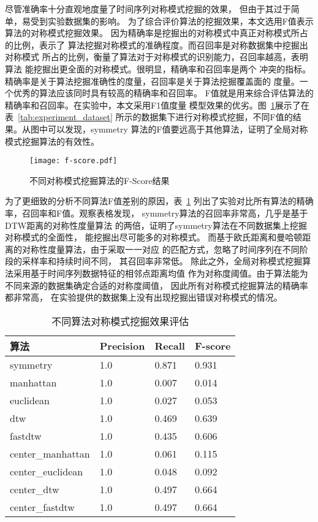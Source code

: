 尽管准确率十分直观地度量了时间序列对称模式挖掘的效果，
但由于其过于简单，易受到实验数据集的影响。
为了综合评价算法的挖掘效果，本文选用F值表示算法的对称模式挖掘效果。
因为精确率是挖掘出的对称模式中真正对称模式所占的比例，表示了
算法挖掘对称模式的准确程度。而召回率是对称数据集中挖掘出对称模式
所占的比例，衡量了算法对于对称模式的识别能力，召回率越高，表明算法
能挖掘出更全面的对称模式。很明显，精确率和召回率是两个
冲突的指标。精确率是关于算法挖掘准确性的度量，召回率是关于算法挖掘覆盖面的
度量。一个优秀的算法应该同时具有较高的精确率和召回率。
F值就是用来综合评估算法的精确率和召回率。在实验中，本文采用F1值度量
模型效果的优劣。图~\ref{fig:fscore_compare}展示了在表~\ref{tab:experiment_dataset}
所示的数据集下进行对称模式挖掘，不同F值的结果。从图中可以发现，symmetry
算法的F值要远高于其他算法，证明了全局对称模式挖掘算法的有效性。
\begin{figure}
  \centering
  \texttt{[image: f-score.pdf]}
  \caption{不同对称模式挖掘算法的F-Score结果}
  \label{fig:fscore_compare}
\end{figure}

为了更细致的分析不同算法F值差别的原因，表~\ref{tab:experiment_global_algo}
列出了实验对比所有算法的精确率，召回率和F值。观察表格发现，
symmetry算法的召回率非常高，几乎是基于DTW距离的对称性度量算法
的两倍，证明了symmetry算法在不同数据集上挖掘对称模式的全面性，
能挖掘出尽可能多的对称模式。
而基于欧氏距离和曼哈顿距离的对称性度量算法，由于采取一一对应
的匹配方式，忽略了时间序列在不同阶段的采样率和持续时间不同，
其召回率非常低。
除此之外，全局对称模式挖掘算法采用基于时间序列数据特征的相邻点距离均值
作为对称度阈值。由于算法能为不同来源的数据集确定合适的对称度阈值，
因此所有对称模式挖掘算法的精确率都非常高，
在实验提供的数据集上没有出现挖掘出错误对称模式的情况。


\begin{table}
  \centering
  \caption{不同算法对称模式挖掘效果评估}
  \begin{tabular}{llll}
    \toprule
    算法              & Precision & Recall & F-score \\
    \midrule
    symmetry          & 1.0       & 0.871  & 0.931   \\
    manhattan         & 1.0       & 0.007  & 0.014   \\
    euclidean         & 1.0       & 0.027  & 0.053   \\
    dtw               & 1.0       & 0.469  & 0.639   \\
    fastdtw           & 1.0       & 0.435  & 0.606   \\
    center\_manhattan & 1.0       & 0.061  & 0.115   \\
    center\_euclidean & 1.0       & 0.048  & 0.092   \\
    center\_dtw       & 1.0       & 0.497  & 0.664   \\
    center\_fastdtw   & 1.0       & 0.497  & 0.664   \\
    \bottomrule
  \end{tabular}
  \label{tab:experiment_global_algo}
\end{table}

